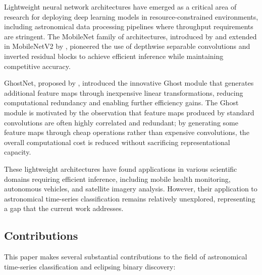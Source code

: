 \documentclass[11pt,a4paper]{article}
\begin{document}
Lightweight neural network architectures have emerged as a critical area of research for deploying deep learning models in resource-constrained environments, including astronomical data processing pipelines where throughput requirements are stringent. The MobileNet family of architectures, introduced by \citet{howard2017mobilenets} and extended in MobileNetV2 by \citet{sandler2018mobilenetv2}, pioneered the use of depthwise separable convolutions and inverted residual blocks to achieve efficient inference while maintaining competitive accuracy.

GhostNet, proposed by \citet{han2020ghostnet}, introduced the innovative Ghost module that generates additional feature maps through inexpensive linear transformations, reducing computational redundancy and enabling further efficiency gains. The Ghost module is motivated by the observation that feature maps produced by standard convolutions are often highly correlated and redundant; by generating some feature maps through cheap operations rather than expensive convolutions, the overall computational cost is reduced without sacrificing representational capacity.

These lightweight architectures have found applications in various scientific domains requiring efficient inference, including mobile health monitoring, autonomous vehicles, and satellite imagery analysis. However, their application to astronomical time-series classification remains relatively unexplored, representing a gap that the current work addresses.

\subsection{Contributions}

This paper makes several substantial contributions to the field of astronomical time-series classification and eclipsing binary discovery:
\end{document}
